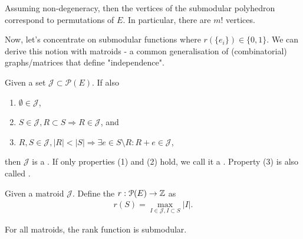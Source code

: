 \begin{note}
    Assuming non-degeneracy, then the vertices of the submodular polyhedron
    correspond to permutations of $E$. In particular, there are $m!$ vertices.
\end{note}
Now, let's concentrate on submodular functions where $r(\{e_i\}) \in \{0,1\}$.
We can derive this notion with matroids - a common generalisation of (combinatorial) graphs/matrices that
define "independence".
\begin{definition}[Matroid]
    Given a set $\mathcal{J} \subset \mathcal{P}(E)$. If also
    \begin{enumerate}
        \item $\emptyset \in \mathcal{J}$,
        \item $S \in \mathcal{J}, R \subset S \Rightarrow R \in \mathcal{J}$, and
        \item $R,S \in \mathcal{J}, |R|< |S| \Rightarrow \exists e \in S\setminus R: R+e\in \mathcal{J}$,
    \end{enumerate}
    then $\mathcal{J}$ is a . If only properties (1) and (2) hold, we call it a .
    Property (3) is also called .
\end{definition}
\begin{definition}
    Given a matroid $\mathcal J$. Define the  $r : \mathcal P(E) \rightarrow \integers$ as
    \begin{align*}
        r(S) = \max_{I \in \mathcal{J}, I \subset S} |I|.
    \end{align*}
\end{definition}
\begin{theorem}
    For all matroids, the rank function is submodular.
\end{theorem}
